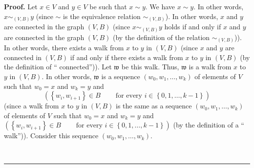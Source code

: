 \documentclass[numbers=enddot,12pt,final,onecolumn,notitlepage]{scrartcl}%
\theoremstyle{definition}
\newenvironment{proof}[1][Proof]{\noindent\textbf{#1.} }{\ \rule{0.5em}{0.5em}}
\newenvironment{verlong}{}{}
\begin{document}
\begin{verlong}
\begin{proof}
Let $x\in V$ and $y\in V$ be such that $x\sim y$. We have $x\sim y$. In other
words, $x\sim_{\left(  V,B\right)  }y$ (since $\sim$ is the equivalence
relation $\sim_{\left(  V,B\right)  }$). In other words, $x$ and $y$ are
connected in the graph $\left(  V,B\right)  $ (since $x\sim_{\left(
V,B\right)  }y$ holds if and only if $x$ and $y$ are connected in the graph
$\left(  V,B\right)  $ (by the definition of the relation $\sim_{\left(
V,B\right)  }$)). In other words, there exists a walk from $x$ to $y$ in
$\left(  V,B\right)  $ (since $x$ and $y$ are connected in $\left(
V,B\right)  $ if and only if there exists a walk from $x$ to $y$ in $\left(
V,B\right)  $ (by the definition of \textquotedblleft
connected\textquotedblright)). Let $\mathfrak{w}$ be this walk. Thus,
$\mathfrak{w}$ is a walk from $x$ to $y$ in $\left(  V,B\right)  $. In other
words, $\mathfrak{w}$ is a sequence $\left(  w_{0},w_{1},\ldots,w_{k}\right)
$ of elements of $V$ such that $w_{0}=x$ and $w_{k}=y$ and%
\begin{equation}
\left(  \left\{  w_{i},w_{i+1}\right\}  \in B\ \ \ \ \ \ \ \ \ \ \text{for
every }i\in\left\{  0,1,\ldots,k-1\right\}  \right)
\label{pf.lem.Eqs.sum.im1.pf.1}%
\end{equation}
(since a walk from $x$ to $y$ in $\left(  V,B\right)  $ is the same as a
sequence $\left(  w_{0},w_{1},\ldots,w_{k}\right)  $ of elements of $V$ such
that $w_{0}=x$ and $w_{k}=y$ and \newline$\left(  \left\{  w_{i}%
,w_{i+1}\right\}  \in B\ \ \ \ \ \ \ \ \ \ \text{for every }i\in\left\{
0,1,\ldots,k-1\right\}  \right)  $ (by the definition of a \textquotedblleft
walk\textquotedblright)). Consider this sequence $\left(  w_{0},w_{1}%
,\ldots,w_{k}\right)  $.


\end{proof}
\end{verlong}
\end{document}
